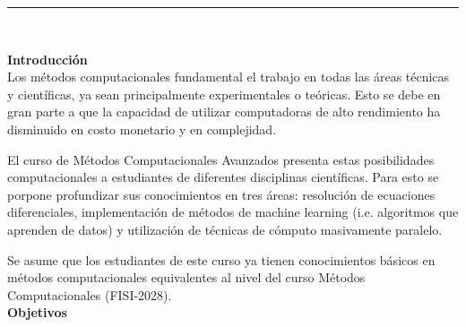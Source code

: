 \documentclass[letterpaper,10pt,onecolumn]{article}
\begin{document}




\noindent\rule{\textwidth}{1pt}\\[-0.1cm]

\addtocounter{mysection}{1}

\noindent\textbf{\large {} \quad Introducci\'on}\\[-0.2cm]


\noindent\normalsize Los m\'etodos computacionales fundamental el
trabajo en todas las \'areas t\'ecnicas y cient\'ificas,
ya sean principalmente experimentales o te\'oricas. Esto se debe en
gran parte a que la capacidad de utilizar computadoras de alto
rendimiento ha disminuido en costo monetario y en complejidad.

El curso de M\'etodos Computacionales Avanzados presenta estas
posibilidades computacionales a estudiantes de diferentes disciplinas
cient\'ificas. Para esto se porpone profundizar sus conocimientos
en tres \'areas: resoluci\'on de ecuaciones diferenciales,
implementaci\'on de m\'etodos de machine learning (i.e. algoritmos que
aprenden de datos) y utilizaci\'on de t\'ecnicas de c\'omputo
masivamente paralelo.

Se asume que los estudiantes de este curso ya tienen conocimientos
b\'asicos en m\'etodos computacionales equivalentes al nivel del curso
M\'etodos Computacionales (FISI-2028).
\\[0.1cm]

\noindent\textbf{\large {} \quad Objetivos}\\[-0.2cm]
\end{document}
